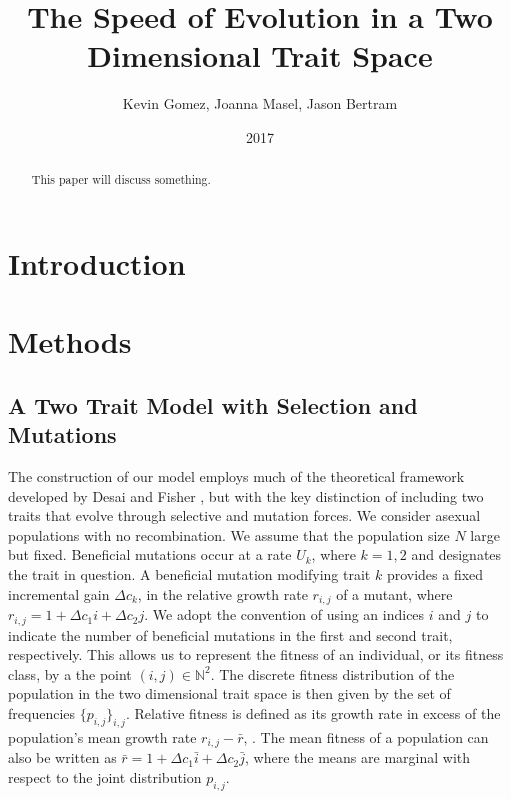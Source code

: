 \documentclass{article}
\begin{document}
\title{The Speed of Evolution in a Two Dimensional Trait Space}
\author{Kevin Gomez, Joanna Masel, Jason Bertram}
\date{2017}

\maketitle
\newpage

\begin{abstract}
This paper will discuss something.
\end{abstract}

\section*{Introduction}

\section*{Methods}
\subsection*{A Two Trait Model with Selection and Mutations}
The construction of our model employs much of the theoretical framework developed by Desai and Fisher \citep{DesFish07}, but with the key distinction of including two traits that evolve through selective and mutation forces.  We consider asexual populations with no recombination.  We assume that the population size $N$ large but fixed.  Beneficial mutations occur at a rate $U_k$, where $k=1,2$ and designates the trait in question.  A beneficial mutation modifying trait $k$ provides a fixed incremental gain $\Delta c_k$, in the relative growth rate $r_{i,j}$ of a mutant, where $r_{i,j}=1+\Delta c_1 i + \Delta c_2 j$.  We adopt the convention of using an indices $i$ and $j$ to indicate the number of beneficial mutations in the first and second trait, respectively.  This allows us to represent the fitness of an individual, or its fitness class, by a the point $(i,j) \in \mathbb{N}^2$.  The discrete fitness distribution of the population in the two dimensional trait space is then given by the set of frequencies $\{p_{i,j}\}_{i,j}$.  Relative fitness is defined as its growth rate in excess of the population's mean growth rate $r_{i,j}-\bar{r}$, .  The mean fitness of a population can also be written as $\bar{r}=1+\Delta c_1 \bar{i} + \Delta c_2 \bar{j}$, where the means are marginal with respect to the joint distribution $p_{i,j}$.  
\end{document}
